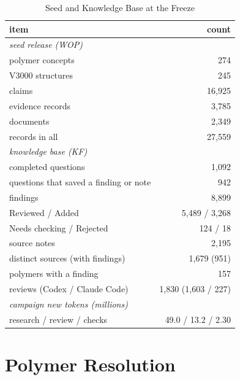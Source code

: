 \documentclass[journal=mamobx,manuscript=suppinfo]{achemso}
\begin{document}
\begin{table}
  \caption{Seed and Knowledge Base at the Freeze}
  \label{tbl:counts}
  \begin{tabular}{lr}
    \toprule
    item & count \\
    \midrule
    \multicolumn{2}{l}{\emph{seed release (WOP)}} \\
    polymer concepts & 274 \\
    V3000 structures & 245 \\
    claims & 16,925 \\
    evidence records & 3,785 \\
    documents & 2,349 \\
    records in all & 27,559 \\
    \multicolumn{2}{l}{\emph{knowledge base (KF)}} \\
    completed questions & 1,092 \\
    questions that saved a finding or note & 942 \\
    findings & 8,899 \\
    \quad Reviewed / Added & 5,489 / 3,268 \\
    \quad Needs checking / Rejected & 124 / 18 \\
    source notes & 2,195 \\
    distinct sources (with findings) & 1,679 (951) \\
    polymers with a finding & 157 \\
    reviews (Codex / Claude Code) & 1,830 (1,603 / 227) \\
    \multicolumn{2}{l}{\emph{campaign new tokens (millions)}} \\
    research / review / checks & 49.0 / 13.2 / 2.30 \\
    \bottomrule
  \end{tabular}
\end{table}

\section{Polymer Resolution}
\label{si:resolution}
\end{document}
